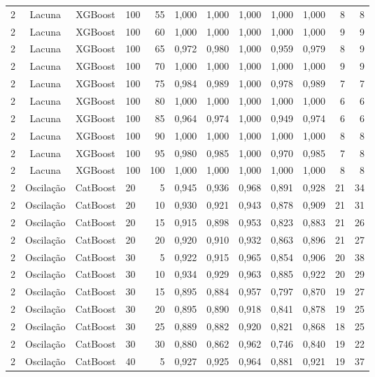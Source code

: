 \begin{longtable}{ccclrrrrrrrr}
2 & Lacuna & XGBoost & 100 & 55 & 1,000 & 1,000 & 1,000 & 1,000 & 1,000 & 8 & 8 \\
2 & Lacuna & XGBoost & 100 & 60 & 1,000 & 1,000 & 1,000 & 1,000 & 1,000 & 9 & 9 \\
2 & Lacuna & XGBoost & 100 & 65 & 0,972 & 0,980 & 1,000 & 0,959 & 0,979 & 8 & 9 \\
2 & Lacuna & XGBoost & 100 & 70 & 1,000 & 1,000 & 1,000 & 1,000 & 1,000 & 9 & 9 \\
2 & Lacuna & XGBoost & 100 & 75 & 0,984 & 0,989 & 1,000 & 0,978 & 0,989 & 7 & 7 \\
2 & Lacuna & XGBoost & 100 & 80 & 1,000 & 1,000 & 1,000 & 1,000 & 1,000 & 6 & 6 \\
2 & Lacuna & XGBoost & 100 & 85 & 0,964 & 0,974 & 1,000 & 0,949 & 0,974 & 6 & 6 \\
2 & Lacuna & XGBoost & 100 & 90 & 1,000 & 1,000 & 1,000 & 1,000 & 1,000 & 8 & 8 \\
2 & Lacuna & XGBoost & 100 & 95 & 0,980 & 0,985 & 1,000 & 0,970 & 0,985 & 7 & 8 \\
2 & Lacuna & XGBoost & 100 & 100 & 1,000 & 1,000 & 1,000 & 1,000 & 1,000 & 8 & 8 \\
2 & Oscilação & CatBoost & 20 & 5 & 0,945 & 0,936 & 0,968 & 0,891 & 0,928 & 21 & 34 \\
2 & Oscilação & CatBoost & 20 & 10 & 0,930 & 0,921 & 0,943 & 0,878 & 0,909 & 21 & 31 \\
2 & Oscilação & CatBoost & 20 & 15 & 0,915 & 0,898 & 0,953 & 0,823 & 0,883 & 21 & 26 \\
2 & Oscilação & CatBoost & 20 & 20 & 0,920 & 0,910 & 0,932 & 0,863 & 0,896 & 21 & 27 \\
2 & Oscilação & CatBoost & 30 & 5 & 0,922 & 0,915 & 0,965 & 0,854 & 0,906 & 20 & 38 \\
2 & Oscilação & CatBoost & 30 & 10 & 0,934 & 0,929 & 0,963 & 0,885 & 0,922 & 20 & 29 \\
2 & Oscilação & CatBoost & 30 & 15 & 0,895 & 0,884 & 0,957 & 0,797 & 0,870 & 19 & 27 \\
2 & Oscilação & CatBoost & 30 & 20 & 0,895 & 0,890 & 0,918 & 0,841 & 0,878 & 19 & 25 \\
2 & Oscilação & CatBoost & 30 & 25 & 0,889 & 0,882 & 0,920 & 0,821 & 0,868 & 18 & 25 \\
2 & Oscilação & CatBoost & 30 & 30 & 0,880 & 0,862 & 0,962 & 0,746 & 0,840 & 19 & 22 \\
2 & Oscilação & CatBoost & 40 & 5 & 0,927 & 0,925 & 0,964 & 0,881 & 0,921 & 19 & 37 \\

\end{longtable}
